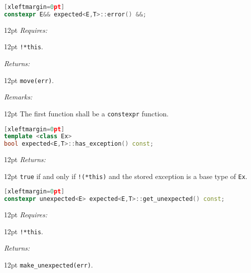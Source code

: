\documentclass[a4paper,10pt]{article}
\newcommand{\cpp}[1]{\lstinline{#1}}
\newcommand{\wordingItem}[1]{\noindent\textit{#1:}}
\newenvironment{wordingTextItem}[1]{\wordingItem{#1}\vspace{2pt}\noindent\begin{adjustwidth}{12pt}{}}{\vspace{2pt}\end{adjustwidth}}
\newenvironment{wordingPara}{\begin{adjustwidth}{12pt}{}}{\end{adjustwidth}}
\begin{document}
\begin{lstlisting}[language=C++][xleftmargin=0pt]
constexpr E&& expected<E,T>::error() &&; 
\end{lstlisting}
\begin{wordingPara}
\begin{wordingTextItem}{Requires}
\cpp{!*this}.
\end{wordingTextItem}
\begin{wordingTextItem}{Returns}
\cpp{move(err)}.
\end{wordingTextItem}
\begin{wordingTextItem}{Remarks}
The first function shall be a \cpp{constexpr} function.
\end{wordingTextItem}
\end{wordingPara}

\begin{lstlisting}[language=C++][xleftmargin=0pt]
template <class Ex>
bool expected<E,T>::has_exception() const;
\end{lstlisting}
\begin{wordingPara}
\begin{wordingTextItem}{Returns}
\cpp{true} if and only if \cpp{!(*this)} and the stored exception is a base type of \cpp{Ex}.
\end{wordingTextItem}
\end{wordingPara}


\begin{lstlisting}[language=C++][xleftmargin=0pt]
constexpr unexpected<E> expected<E,T>::get_unexpected() const;
\end{lstlisting}
\begin{wordingPara}
\begin{wordingTextItem}{Requires}
\cpp{!*this}.
\end{wordingTextItem}
\begin{wordingTextItem}{Returns}
\cpp{make_unexpected(err)}.
\end{wordingTextItem}
\end{wordingPara}
\end{document}
